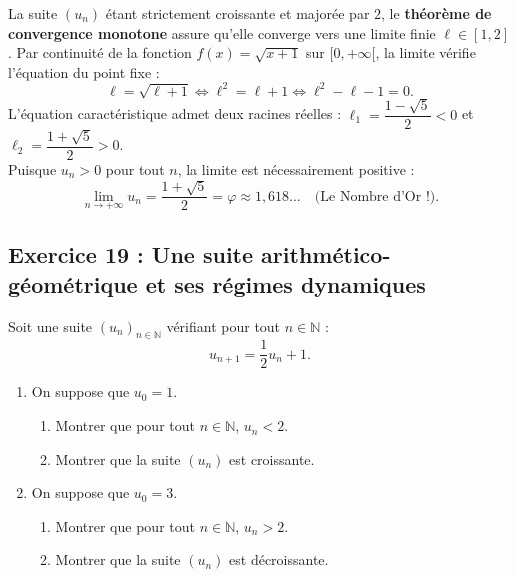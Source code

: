 \documentclass[11pt,a4paper]{article}
\newcommand{\N}{\mathbb{N}}
\begin{document}
\begin{remarquabox}
La suite $(u_n)$ étant strictement croissante et majorée par $2$, le \textbf{théorème de convergence monotone} assure qu'elle converge vers une limite finie $\ell \in [1, 2]$.
Par continuité de la fonction $f(x) = \sqrt{x+1}$ sur $[0, +\infty[$, la limite vérifie l'équation du point fixe :
\[
\ell = \sqrt{\ell + 1} \iff \ell^2 = \ell + 1 \iff \ell^2 - \ell - 1 = 0.
\]
L'équation caractéristique admet deux racines réelles : $\ell_1 = \dfrac{1 - \sqrt{5}}{2} < 0$ et $\ell_2 = \dfrac{1 + \sqrt{5}}{2} > 0$.\\
Puisque $u_n > 0$ pour tout $n$, la limite est nécessairement positive :
\[
\lim_{n \to +\infty} u_n = \frac{1 + \sqrt{5}}{2} = \varphi \approx 1{,}618\dots \quad \text{(Le Nombre d'Or !)}.
\]
\end{remarquabox}

\subsection*{Exercice 19 : Une suite arithmético-géométrique et ses régimes dynamiques}

Soit une suite $(u_n)_{n \in \N}$ vérifiant pour tout $n \in \N$ :
\[
u_{n+1} = \frac{1}{2} u_n + 1.
\]
\begin{enumerate}
    \item On suppose que $u_0 = 1$.
    \begin{enumerate}[label=(\alph*)]
        \item Montrer que pour tout $n \in \N$, $u_n < 2$.
        \item Montrer que la suite $(u_n)$ est croissante.
    \end{enumerate}
    \item On suppose que $u_0 = 3$.
    \begin{enumerate}[label=(\alph*)]
        \item Montrer que pour tout $n \in \N$, $u_n > 2$.
        \item Montrer que la suite $(u_n)$ est décroissante.
    \end{enumerate}
\end{enumerate}
\end{document}
